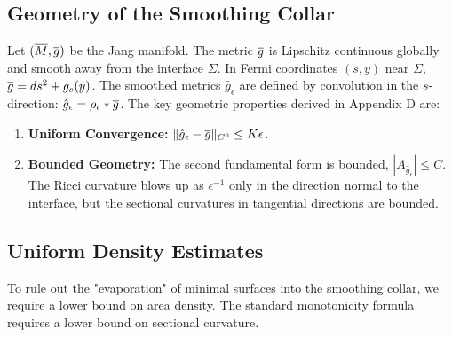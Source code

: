 \subsection{Geometry of the Smoothing Collar}
Let $(\overline{M}, \overline{g})$ be the Jang manifold. The metric $\overline{g}$ is Lipschitz continuous globally and smooth away from the interface $\Sigma$. In Fermi coordinates $(s, y)$ near $\Sigma$, $\overline{g} = ds^2 + g_s(y)$.
The smoothed metrics $\hat{g}_\epsilon$ are defined by convolution in the $s$-direction: $\hat{g}_\epsilon = \rho_\epsilon * \overline{g}$.
The key geometric properties derived in Appendix D are:
\begin{enumerate}
    \item \textbf{Uniform Convergence:} $\|\hat{g}_\epsilon - \overline{g}\|_{C^0} \le K \epsilon$.
    \item \textbf{Bounded Geometry:} The second fundamental form is bounded, $|A_{\hat{g}_\epsilon}| \le C$. The Ricci curvature blows up as $\epsilon^{-1}$ only in the direction normal to the interface, but the sectional curvatures in tangential directions are bounded.
\end{enumerate}

\subsection{Uniform Density Estimates}
To rule out the "evaporation" of minimal surfaces into the smoothing collar, we require a lower bound on area density. The standard monotonicity formula requires a lower bound on sectional curvature.

